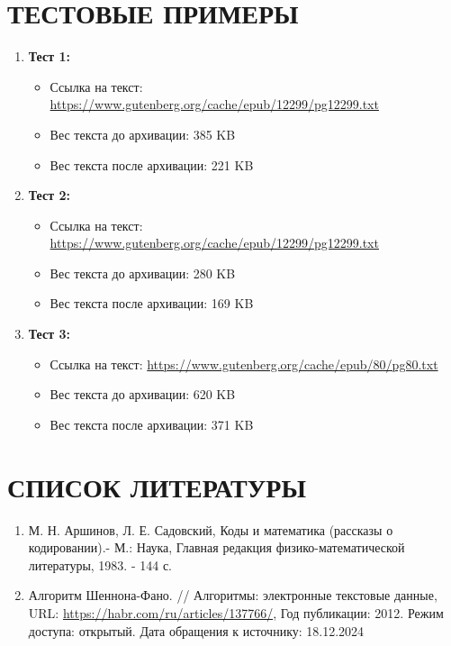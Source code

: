 \documentclass[12pt]{article}
\begin{document}
\section{\textbf{ТЕСТОВЫЕ ПРИМЕРЫ}}
\begin{enumerate}
    \item \textbf{Тест 1:}
    \begin{itemize}
        \item Ссылка на текст: \url{https://www.gutenberg.org/cache/epub/12299/pg12299.txt}
        \item Вес текста до архивации: 385 KB
        \item Вес текста после архивации: 221 KB
    \end{itemize}
    \item \textbf{Тест 2:}
    \begin{itemize}
        \item Ссылка на текст: \url{https://www.gutenberg.org/cache/epub/12299/pg12299.txt}
        \item Вес текста до архивации: 280 KB
        \item Вес текста после архивации: 169 KB
    \end{itemize}
    \item \textbf{Тест 3:}
    \begin{itemize}
        \item Ссылка на текст: \url{https://www.gutenberg.org/cache/epub/80/pg80.txt}
        \item Вес текста до архивации: 620 KB
        \item Вес текста после архивации: 371 KB
    \end{itemize}
\end{enumerate}

\newpage
\section{\textbf{СПИСОК ЛИТЕРАТУРЫ}}
\begin{enumerate}
    \item М. Н. Аршинов, Л. Е. Садовский, Коды и математика (рассказы о кодировании).- М.: Наука, Главная редакция физико-математической литературы, 1983. - 144 с.
    \item Алгоритм Шеннона-Фано. // Алгоритмы: электронные текстовые данные, URL: \url{https://habr.com/ru/articles/137766/}, Год публикации: 2012. Режим доступа: открытый. Дата обращения к источнику: 18.12.2024
\end{enumerate}
\end{document}
